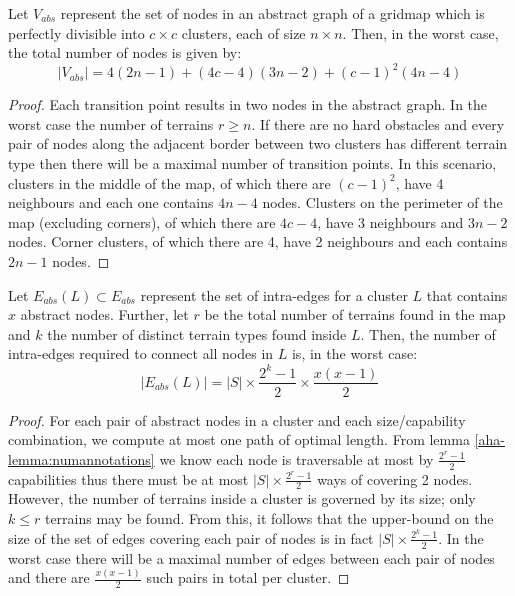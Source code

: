 \begin{lemma}
\label{aha-lemma:maxnodes}
Let $V_{abs}$ represent the set of nodes in an abstract graph of a gridmap which is perfectly divisible into $c \times c$ clusters, each of size $n \times n$. Then, in the worst case, the total number of nodes is given by:
$$|V_{abs}| = 4(2n-1) + (4c - 4)(3n-2) + (c-1)^2(4n-4)$$
\end{lemma}

\begin{proof}
Each transition point results in two nodes in the abstract graph. 
In the worst case the number of terrains $r \geq n$. 
If there are no hard obstacles and every pair of nodes along the adjacent border between two clusters has different terrain type then there will be a maximal number of transition points. 
In this scenario, clusters in the middle of the map, of which there are $(c-1)^2$, have 4 neighbours and each one contains $4n-4$ nodes. 
Clusters on the perimeter of the map (excluding corners), of which there are $4c-4$, have 3 neighbours and $3n-2$ nodes. 
Corner clusters, of which there are 4, have 2 neighbours and each contains $2n-1$ nodes.
\end{proof}

\begin{lemma}
\label{aha-lemma:maxedgesincluster}
Let $E_{abs}(L) \subset E_{abs}$ represent the set of intra-edges for a cluster $L$ that contains $x$ abstract nodes. Further, let $r$ be the total number of terrains found in the map and $k$ the number of distinct terrain types found inside $L$. Then, the number of intra-edges required to connect all nodes in $L$ is, in the worst case:
 $$|E_{abs}(L)| = |S|\times \frac{2^{k}-1}{2} \times \frac{x(x-1)}{2}$$
 \end{lemma}

\begin{proof}
For each pair of abstract nodes in a cluster and each size/capability combination, we compute at most one path of optimal length. 
From lemma \ref{aha-lemma:numannotations} we know each node is traversable at most by $\frac{2^{r}-1}{2}$ capabilities thus there must be at most $|S|\times \frac{2^{r}-1}{2}$ ways of covering 2 nodes. 
However, the number of terrains inside a cluster is governed by its size; only $k \leq r$ terrains may be found. 
From this, it follows that the upper-bound on the size of the set of edges covering each pair of nodes is in fact $|S| \times \frac{2^{k}-1}{2}$. 
In the worst case there will be a maximal number of edges between each pair of nodes and there are $\frac{x(x-1)}{2}$ such pairs in total per cluster. 
\end{proof}

